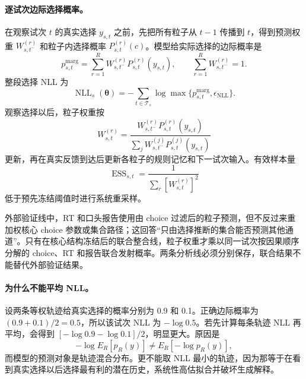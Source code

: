 \paragraph{逐试次边际选择概率。}
在观察试次 $t$ 的真实选择 $y_{s,t}$ 之前，先把所有粒子从 $t-1$ 传播到 $t$，得到预测权重 $W^{(r)}_{s,t^-}$ 和粒子内选择概率 $P^{(r)}_{s,t}(c)$。模型给实际选择的边际概率是
\begin{equation}
    p_{s,t}^{\mathrm{marg}}
    =\sum_{r=1}^{R}W^{(r)}_{s,t^-}
      P^{(r)}_{s,t}(y_{s,t}),
    \qquad
    \sum_{r=1}^{R}W^{(r)}_{s,t^-}=1.
    \label{eq:model0804-marginal-choice}
\end{equation}
整段选择 NLL 为
\begin{equation}
    \operatorname{NLL}_s(\boldsymbol\theta)
    =-\sum_{t\in\mathcal T_s}
      \log\max\{p_{s,t}^{\mathrm{marg}},\epsilon_{\mathrm{NLL}}\}.
    \label{eq:model0804-nll}
\end{equation}
观察选择以后，粒子权重按
\begin{equation}
    W^{(r)}_{s,t}
    =\frac{W^{(r)}_{s,t^-}P^{(r)}_{s,t}(y_{s,t})}
    {\sum_jW^{(j)}_{s,t^-}P^{(j)}_{s,t}(y_{s,t})}
    \label{eq:model0804-particle-weight-update}
\end{equation}
更新，再在真实反馈到达后更新各粒子的规则记忆和下一试次输入。有效样本量
\begin{equation}
    \operatorname{ESS}_{s,t}
    =\frac{1}{\sum_r[W^{(r)}_{s,t}]^2}
    \label{eq:model0804-ess}
\end{equation}
低于预先冻结阈值时进行系统重采样。

外部验证线中，RT 和口头报告使用由 choice 过滤后的粒子预测，但不反过来重加权核心 choice 参数或集合路径；这回答“只由选择推断的集合能否预测其他通道”。只有在核心结构冻结后的联合整合线，粒子权重才乘以同一试次按因果顺序分解的 choice、RT 和报告联合发射概率。两条分析线必须分别保存，联合结果不能替代外部验证结果。

\paragraph{为什么不能平均 NLL。}
设两条等权轨迹给真实选择的概率分别为 0.9 和 0.1。正确边际概率为 $(0.9+0.1)/2=0.5$，所以该试次 NLL 为 $-\log0.5$。若先计算每条轨迹 NLL 再平均，会得到 $[-\log0.9-\log0.1]/2$，明显更大。原因是
\begin{equation}
    -\log E_R[p_R(y)]
    \neq E_R[-\log p_R(y)],
    \label{eq:model0804-log-average}
\end{equation}
而模型的预测对象是轨迹混合分布。更不能取 NLL 最小的轨迹，因为那等于在看到真实选择以后选择最有利的潜在历史，系统性高估拟合并破坏生成解释。

